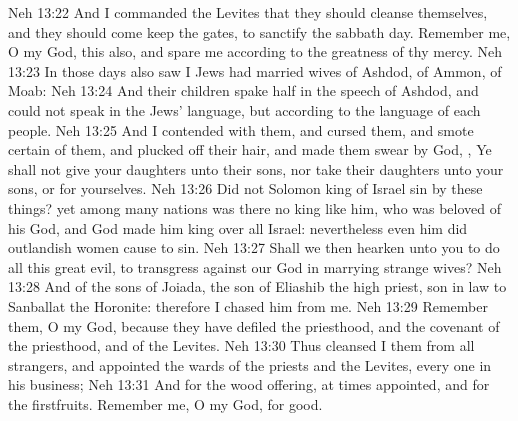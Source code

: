 \vs Neh 13:22 And I commanded the Levites that they should cleanse themselves, and  they should come  keep the gates, to sanctify the sabbath day. Remember me, O my God,  this also, and spare me according to the greatness of thy mercy.
\vs Neh 13:23 In those days also saw I Jews  had married wives of Ashdod, of Ammon,  of Moab:
\vs Neh 13:24 And their children spake half in the speech of Ashdod, and could not speak in the Jews' language, but according to the language of each people.
\vs Neh 13:25 And I contended with them, and cursed them, and smote certain of them, and plucked off their hair, and made them swear by God, , Ye shall not give your daughters unto their sons, nor take their daughters unto your sons, or for yourselves.
\vs Neh 13:26 Did not Solomon king of Israel sin by these things? yet among many nations was there no king like him, who was beloved of his God, and God made him king over all Israel: nevertheless even him did outlandish women cause to sin.
\vs Neh 13:27 Shall we then hearken unto you to do all this great evil, to transgress against our God in marrying strange wives?
\vs Neh 13:28 And  of the sons of Joiada, the son of Eliashib the high priest,  son in law to Sanballat the Horonite: therefore I chased him from me.
\vs Neh 13:29 Remember them, O my God, because they have defiled the priesthood, and the covenant of the priesthood, and of the Levites.
\vs Neh 13:30 Thus cleansed I them from all strangers, and appointed the wards of the priests and the Levites, every one in his business;
\vs Neh 13:31 And for the wood offering, at times appointed, and for the firstfruits. Remember me, O my God, for good.
